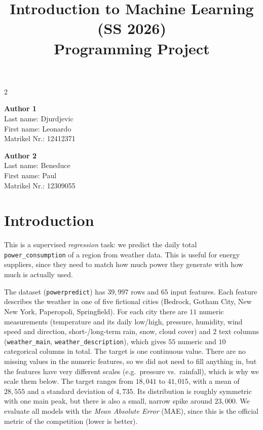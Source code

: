 \documentclass[a4, 10 pt, conference]{ieeeconf}  %
\title{\LARGE \bf
Introduction to Machine Learning (SS 2026)\\ Programming Project
\vspace{-3em}
}
\begin{document}
\maketitle
\vspace{-3em}
\thispagestyle{empty}
\pagestyle{empty}

\begin{strip}
\begin{tcolorbox}[
size=tight,
colback=white,
boxrule=0.2mm,
left=3mm,right=3mm, top=3mm, bottom=1mm
]
{\begin{multicols}{2}%

\textbf{Author 1}       \\
Last name: Djurdjevic   \\
First name: Leonardo \\
Matrikel Nr.: 12412371 \\

\columnbreak

\textbf{Author 2}       \\
Last name: Beneduce             \\
First name: Paul             \\
Matrikel Nr.: 12309055               \\

\end{multicols}}
\end{tcolorbox}
\end{strip}


\section{Introduction}
\label{sec:intro}

This is a supervised \emph{regression} task: we predict the daily total
\texttt{power\_consumption} of a region from weather data. This is useful for
energy suppliers, since they need to match how much power they generate with
how much is actually used.

The dataset (\texttt{powerpredict}) has $39{,}997$ rows and $65$ input
features. Each feature describes the weather in one of five fictional cities
(Bedrock, Gotham City, New New York, Paperopoli, Springfield). For each city
there are $11$ numeric measurements (temperature and its daily low/high,
pressure, humidity, wind speed and direction, short-/long-term rain, snow,
cloud cover) and $2$ text columns (\texttt{weather\_main},
\texttt{weather\_description}), which gives $55$ numeric and $10$ categorical
columns in total. The target is one continuous value. There are no missing
values in the numeric features, so we did not need to fill anything in, but
the features have very different scales (e.g.\ pressure vs.\ rainfall), which
is why we scale them below. The target ranges from $18{,}041$ to $41{,}015$,
with a mean of $28{,}555$ and a standard deviation of $4{,}735$. Its
distribution is roughly symmetric with one main peak, but there is also a
small, narrow spike around $23{,}000$. We evaluate all models with the
\emph{Mean Absolute Error} (MAE), since this is the official metric of the
competition (lower is better).
\end{document}
